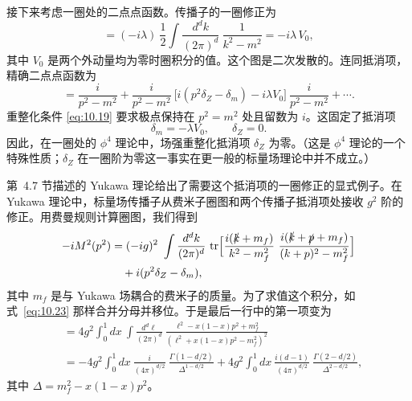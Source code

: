 接下来考虑一圈处的二点点函数。传播子的一圈修正为
\begin{equation}
  = (-i\lambda)\ \frac{1}{2}\int \frac{d^dk}{(2\pi)^d}\ \frac{1}{k^2-m^2}
  = -i\lambda\,V_0 ,
\end{equation}
其中 $V_0$ 是两个外动量均为零时圈积分的值。这个图是二次发散的。连同抵消项，精确二点点函数为
\begin{equation}
  = \frac{i}{p^2-m^2} + \frac{i}{p^2-m^2}\ \bigl[
    i(p^2\delta_Z - \delta_m) - i\lambda V_0 \bigr]\ \frac{i}{p^2-m^2}
    + \cdots .
  \label{eq:10.28}
\end{equation}
重整化条件 \eqref{eq:10.19} 要求极点保持在 $p^2 = m^2$ 处且留数为 $i$。这固定了抵消项
\begin{equation}
  \delta_m = -\lambda V_0,\qquad \delta_Z = 0 .
  \label{eq:10.29}
\end{equation}
因此，在一圈处的 $\phi^4$ 理论中，场强重整化抵消项 $\delta_Z$ 为零。（这是 $\phi^4$ 理论的一个特殊性质；$\delta_Z$ 在一圈阶为零这一事实在更一般的标量场理论中并不成立。）

第~4.7 节描述的 Yukawa 理论给出了需要这个抵消项的一圈修正的显式例子。在 Yukawa 理论中，标量场传播子从费米子圈图和两个传播子抵消项处接收 $g^2$ 阶的修正。用费曼规则计算圈图，我们得到
\begin{equation}
  \begin{aligned}
    -iM^2(p^2) &= (-ig)^2\ \int \frac{d^dk}{(2\pi)^d}\ \mathrm{tr}\Bigl[
      \frac{i(\slashed{k}+m_f)}{k^2-m_f^2}\ \frac{i(\slashed{k}+\slashed{p}
        +m_f)}{(k+p)^2-m_f^2} \Bigr]\\
    &\quad + i(p^2\delta_Z - \delta_m) ,
  \end{aligned}
  \label{eq:10.32}
\end{equation}
其中 $m_f$ 是与 Yukawa 场耦合的费米子的质量。为了求值这个积分，如式~\eqref{eq:10.23} 那样合并分母并移位。于是最后一行中的第一项变为
\begin{equation}
  \begin{aligned}
    &= 4g^2\int_0^1 dx\ \int \frac{d^d\ell}{(2\pi)^d}\
      \frac{\ell^2 - x(1-x)p^2 + m_f^2}{(\ell^2 + x(1-x)p^2 - m_f^2)^2}\\
    &= -4g^2\int_0^1 dx\ \frac{i}{(4\pi)^{d/2}}\ \frac{\Gamma(1-d/2)}
      {\Delta^{1-d/2}} + 4g^2\int_0^1 dx\ \frac{i(d-1)}{(4\pi)^{d/2}}\
      \frac{\Gamma(2-d/2)}{\Delta^{2-d/2}} ,
  \end{aligned}
  \label{eq:10.33}
\end{equation}
其中 $\Delta = m_f^2 - x(1-x)p^2$。

